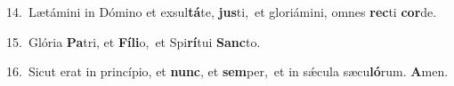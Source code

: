 {\numbfont\textcolor{\numbcolor}{14.}}~Lætámini in Dómino et exsul\-\textbf{tá}\-te, \textbf{jus}\-ti,~\star et gloriámini, omnes \textbf{rec}\-ti \textbf{cor}\-de.\par
{\numbfont\textcolor{\numbcolor}{15.}}~Glória \textbf{Pa}\-tri, et \textbf{Fí}\-\textbf{li}o,~\star et Spi\-\textbf{rí}\-tui \textbf{Sanc}\-to.\par
{\numbfont\textcolor{\numbcolor}{16.}}~Sicut erat in princípio, et \textbf{nunc}\-, et \textbf{sem}\-per,~\star et in sǽcula sæcu\-\textbf{ló}\-rum. \textbf{A}\-men.\par
